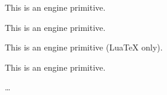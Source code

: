 \begin{function}[]
  {
    \lastpenalty
  }
  \begin{syntax}
  \end{syntax}
  This is an engine primitive.
\end{function}



\begin{function}[]
  {
    \lastskip
  }
  \begin{syntax}
  \end{syntax}
  This is an engine primitive.
\end{function}



\begin{function}[]
  {
    \latelua
  }
  \begin{syntax}
  \end{syntax}
  This is an engine primitive (Lua\TeX{} only).
\end{function}



\begin{function}[]
  {
    \lbrace
  }
  \begin{syntax}
  \end{syntax}

\end{function}



\begin{function}[]
  {
    \lbrack
  }
  \begin{syntax}
  \end{syntax}

\end{function}



\begin{function}[]
  {
    \lccode
  }
  \begin{syntax}
  \end{syntax}
  This is an engine primitive.
\end{function}



\begin{function}[]
  {
    \ldots
  }
  \begin{syntax}
  \end{syntax}

\end{function}



